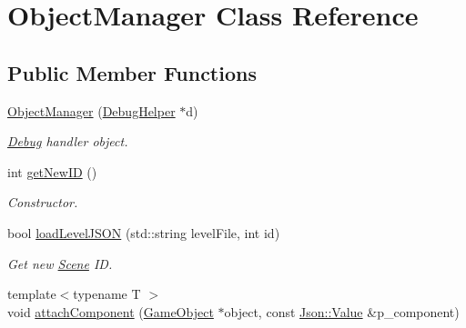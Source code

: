 \hypertarget{class_object_manager}{\section{Object\+Manager Class Reference}
\label{class_object_manager}
}
\subsection*{Public Member Functions}
\begin{DoxyCompactItemize}
\item 
\hypertarget{class_object_manager_afc985bd1e973ef44860b996180f3c657}{\hyperlink{class_object_manager_afc985bd1e973ef44860b996180f3c657}{Object\+Manager} (\hyperlink{class_debug_helper}{Debug\+Helper} $\ast$d)}\label{class_object_manager_afc985bd1e973ef44860b996180f3c657}

\begin{DoxyCompactList}\small\item\em \hyperlink{class_debug}{Debug} handler object. \end{DoxyCompactList}\item 
\hypertarget{class_object_manager_a550d7be8dd5e15d912c533dd3e4e31ab}{int \hyperlink{class_object_manager_a550d7be8dd5e15d912c533dd3e4e31ab}{get\+New\+I\+D} ()}\label{class_object_manager_a550d7be8dd5e15d912c533dd3e4e31ab}

\begin{DoxyCompactList}\small\item\em Constructor. \end{DoxyCompactList}\item 
\hypertarget{class_object_manager_a845db4dd11b1a5d7d1817c53fd4ab9eb}{bool \hyperlink{class_object_manager_a845db4dd11b1a5d7d1817c53fd4ab9eb}{load\+Level\+J\+S\+O\+N} (std\+::string level\+File, int id)}\label{class_object_manager_a845db4dd11b1a5d7d1817c53fd4ab9eb}

\begin{DoxyCompactList}\small\item\em Get new \hyperlink{class_scene}{Scene} I\+D. \end{DoxyCompactList}\item 
\hypertarget{class_object_manager_a1fb1d8ec2c389970395beb9d1329de50}{{\footnotesize template$<$typename T $>$ }\\void \hyperlink{class_object_manager_a1fb1d8ec2c389970395beb9d1329de50}{attach\+Component} (\hyperlink{class_game_object}{Game\+Object} $\ast$object, const \hyperlink{class_json_1_1_value}{Json\+::\+Value} \&p\+\_\+component)}\label{class_object_manager_a1fb1d8ec2c389970395beb9d1329de50}


\end{DoxyCompactItemize}
